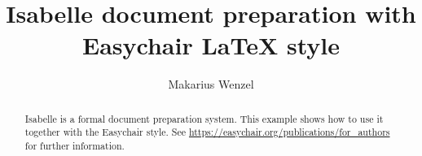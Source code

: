 \documentclass[a4paper,11pt]{easychair}
\begin{document}
\title{Isabelle document preparation with Easychair {\LaTeX} style}
\author{Makarius Wenzel}
\maketitle

\begin{abstract}
Isabelle is a formal document preparation system. This example shows how to
use it together with the Easychair style. See
\url{https://easychair.org/publications/for_authors} for further information.
\end{abstract}





\end{document}
